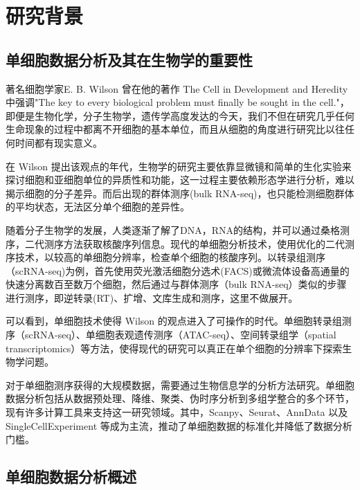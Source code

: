 
\section{研究背景}
\subsection{单细胞数据分析及其在生物学的重要性}

著名细胞学家E. B. Wilson 曾在他的著作 The Cell in Development and Heredity中强调"The key to every biological problem must finally be sought in the cell."，即便是生物化学，分子生物学，遗传学高度发达的今天，我们不但在研究几乎任何生命现象的过程中都离不开细胞的基本单位，而且从细胞的角度进行研究比以往任何时间都有现实意义。

在 Wilson 提出该观点的年代，生物学的研究主要依靠显微镜和简单的生化实验来探讨细胞和亚细胞单位的异质性和功能，这一过程主要依赖形态学进行分析，难以揭示细胞的分子差异。而后出现的群体测序(bulk RNA-seq)，也只能检测细胞群体的平均状态，无法区分单个细胞的差异性。

随着分子生物学的发展，人类逐渐了解了DNA，RNA的结构，并可以通过桑格测序，二代测序方法获取核酸序列信息。现代的单细胞分析技术，使用优化的二代测序技术，以较高的单细胞分辨率，检查单个细胞的核酸序列。以转录组测序（scRNA-seq)为例，首先使用荧光激活细胞分选术(FACS)或微流体设备高通量的快速分离数百至数万个细胞，然后通过与群体测序（bulk RNA-seq）类似的步骤进行测序，即逆转录(RT)、扩增、文库生成和测序，这里不做展开。

可以看到，单细胞技术使得 Wilson 的观点进入了可操作的时代。单细胞转录组测序（scRNA-seq）、单细胞表观遗传测序（ATAC-seq）、空间转录组学（spatial transcriptomics）等方法，使得现代的研究可以真正在单个细胞的分辨率下探索生物学问题。

对于单细胞测序获得的大规模数据，需要通过生物信息学的分析方法研究。单细胞数据分析包括从数据预处理、降维、聚类、伪时序分析到多组学整合的多个环节，现有许多计算工具来支持这一研究领域。其中，Scanpy、Seurat、AnnData 以及 SingleCellExperiment 等成为主流，推动了单细胞数据的标准化并降低了数据分析门槛。

\subsection{单细胞数据分析概述}



